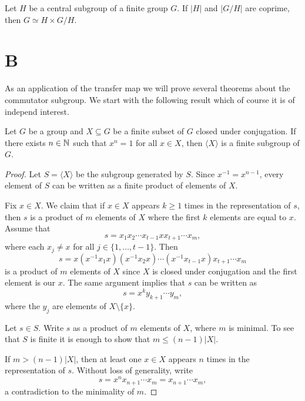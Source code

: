 \begin{exercise}
	Let $H$ be a central subgroup of a finite group $G$. If $|H|$
	and $|G/H|$ are coprime, then $G\simeq H\times G/H$.
\end{exercise}



\section*{B}

As an application of the transfer map we will prove several theorems
about the commutator subgroup. We start
with the following result which of course it is of independ interest. 

\begin{theorem}[Dietzmann]
	\label{theorem:Dietzmann} 
	Let $G$ be a group and $X\subseteq G$ be a finite subset of 
	$G$ closed under conjugation. If there exists $n\in\mathbb{N}$ such that 
	$x^n=1$ for all $x\in X$, then $\langle X\rangle$ is a finite subgroup of 
	$G$.
\end{theorem}

\begin{proof}
	Let $S=\langle X\rangle$ be the subgroup generated by $S$. Since $x^{-1}=x^{n-1}$, every element 
	of $S$ can be written as a finite product of elements of $X$. 
	
	Fix $x\in X$. We claim that if $x\in X$ appears $k\geq 1$ times in the representation of $s$, then 
	$s$ is a product of $m$
	elements of $X$ where the first $k$ elements are equal to $x$. Assume that 
	\[
	s=x_1x_2\cdots x_{t-1}xx_{t+1}\cdots x_m,
	\]
	where each $x_j\ne x$ for all $j\in\{1,\dots,t-1\}$. Then 
	\[
		s=x(x^{-1}x_1x)(x^{-1}x_2x)\cdots (x^{-1}x_{t-1}x)x_{t+1}\cdots x_m
	\]
	is a product of $m$ elements of $X$ since $X$ is closed under conjugation and
	the first element is our $x$. The same argument implies that $s$
	can be written as 
	\[
		s=x^ky_{k+1}\cdots y_m,
	\]
	where the $y_j$ are elements of $X\setminus\{x\}$.

	Let $s\in S$. Write $s$ as a product of $m$ elements of $X$,
	where $m$ is minimal. To see that $S$ is finite it is enough to show that  
	$m\leq (n-1)|X|$. 
	
	If $m>(n-1)|X|$, then 
	at least one $x\in X$ appears $n$ times in the representation of $s$. Without loss of generality, write
	\[
		s=x^nx_{n+1}\cdots x_m=x_{n+1}\cdots x_m,
	\]
	a contradiction to the minimality of $m$. 
\end{proof}

